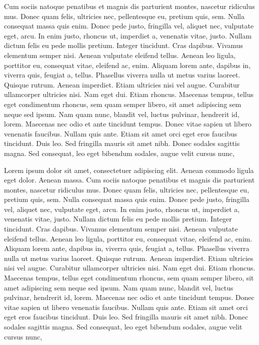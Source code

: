 \documentclass[a4paper,11pt,spanish, twoside, leqno]{tfg-uam}
\theoremstyle{definition}
\begin{document}
Cum sociis natoque penatibus et magnis dis parturient montes, nascetur ridiculus mus. Donec quam felis, ultricies nec, pellentesque eu, pretium quis, sem. Nulla consequat massa quis enim. Donec pede justo, fringilla vel, aliquet nec, vulputate eget, arcu. In enim justo, rhoncus ut, imperdiet a, venenatis vitae, justo. Nullam dictum felis eu pede mollis pretium. Integer tincidunt. Cras dapibus. Vivamus elementum semper nisi. Aenean vulputate eleifend tellus. Aenean leo ligula, porttitor eu, consequat vitae, eleifend ac, enim. Aliquam lorem ante, dapibus in, viverra quis, feugiat a, tellus. Phasellus viverra nulla ut metus varius laoreet. Quisque rutrum. Aenean imperdiet. Etiam ultricies nisi vel augue. Curabitur ullamcorper ultricies nisi. Nam eget dui. Etiam rhoncus. Maecenas tempus, tellus eget condimentum rhoncus, sem quam semper libero, sit amet adipiscing sem neque sed ipsum. Nam quam nunc, blandit vel, luctus pulvinar, hendrerit id, lorem. Maecenas nec odio et ante tincidunt tempus. Donec vitae sapien ut libero venenatis faucibus. Nullam quis ante. Etiam sit amet orci eget eros faucibus tincidunt. Duis leo. Sed fringilla mauris sit amet nibh. Donec sodales sagittis magna. Sed consequat, leo eget bibendum sodales, augue velit cursus nunc,

Lorem ipsum dolor sit amet, consectetuer adipiscing elit. Aenean commodo ligula eget dolor. Aenean massa. Cum sociis natoque penatibus et magnis dis parturient montes, nascetur ridiculus mus. Donec quam felis, ultricies nec, pellentesque eu, pretium quis, sem. Nulla consequat massa quis enim. Donec pede justo, fringilla vel, aliquet nec, vulputate eget, arcu. In enim justo, rhoncus ut, imperdiet a, venenatis vitae, justo. Nullam dictum felis eu pede mollis pretium. Integer tincidunt. Cras dapibus. Vivamus elementum semper nisi. Aenean vulputate eleifend tellus. Aenean leo ligula, porttitor eu, consequat vitae, eleifend ac, enim. Aliquam lorem ante, dapibus in, viverra quis, feugiat a, tellus. Phasellus viverra nulla ut metus varius laoreet. Quisque rutrum. Aenean imperdiet. Etiam ultricies nisi vel augue. Curabitur ullamcorper ultricies nisi. Nam eget dui. Etiam rhoncus. Maecenas tempus, tellus eget condimentum rhoncus, sem quam semper libero, sit amet adipiscing sem neque sed ipsum. Nam quam nunc, blandit vel, luctus pulvinar, hendrerit id, lorem. Maecenas nec odio et ante tincidunt tempus. Donec vitae sapien ut libero venenatis faucibus. Nullam quis ante. Etiam sit amet orci eget eros faucibus tincidunt. Duis leo. Sed fringilla mauris sit amet nibh. Donec sodales sagittis magna. Sed consequat, leo eget bibendum sodales, augue velit cursus nunc,
\end{document}
